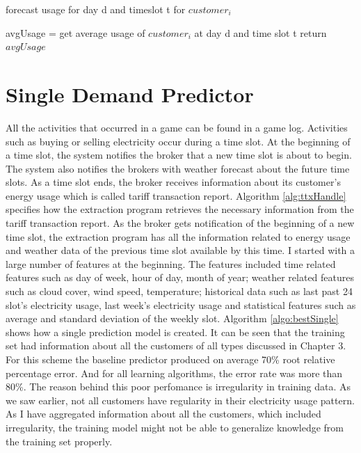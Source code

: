 \begin{algorithm}
\caption{forecast usage for day d and timeslot t for $customer_i$}
\begin{algorithmic} [1]
\STATE avgUsage = get average usage of $customer_i$ at day d and time slot t 
\STATE return $avgUsage$
\end{algorithmic}
 \label{alg:predictAvgMovingAvg}
\end{algorithm}

\section{Single Demand Predictor}
All the activities that occurred in a game can be found in a game log.  Activities such as buying or selling electricity occur during a time slot. At the beginning of a time slot, the system notifies the broker that a new time slot is about to begin. The system also notifies the brokers with weather forecast about the future time slots. As a time slot ends, the broker receives information about its customer's energy usage which is called tariff transaction report. Algorithm \ref{alg:ttxHandle} specifies how the extraction program retrieves the necessary information from the tariff transaction report. As the broker gets notification of the beginning of a new time slot, the extraction program has all the information related to energy usage and weather data of the previous time slot available by this time. I started with a large number of features at the beginning. The features included time related features such as day of week, hour of day, month of year; weather related features such as cloud cover, wind speed, temperature; historical data such as last past 24 slot's electricity usage, last week's electricity usage and statistical features such as average and standard deviation of the weekly slot. Algorithm \ref{algo:bestSingle} shows how a single prediction model is created. It can be seen that the training set had information about all the customers of all types discussed in Chapter 3. For this scheme the baseline predictor produced on average 70\% root relative percentage error. And for all learning algorithms, the error rate was more than 80\%. The reason behind this poor perfomance is irregularity in training data. As we saw earlier, not all customers have regularity in their electricity usage pattern. As I have aggregated information about all the customers, which included irregularity, the training model might not be able to generalize knowledge from the training set properly. 

